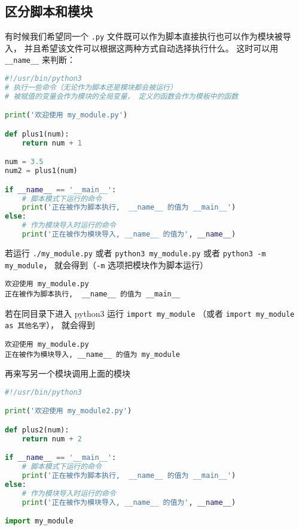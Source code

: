 
\begin{issues}
\issueDraft
\end{issues}

\subsection{区分脚本和模块}
有时候我们希望同一个 \verb|.py| 文件既可以作为脚本直接执行也可以作为模块被导入， 并且希望该文件可以根据这两种方式自动选择执行什么。 这时可以用 \verb|__name__| 来判断：
\begin{lstlisting}[language=python, caption=my\_module.py]
#!/usr/bin/python3
# 执行一些命令（无论作为脚本还是模块都会被运行）
# 被赋值的变量会作为模块的全局变量， 定义的函数会作为模板中的函数

print('欢迎使用 my_module.py')

def plus1(num):
    return num + 1

num = 3.5
num2 = plus1(num)

if __name__ == '__main__':
    # 脚本模式下运行的命令
    print('正在被作为脚本执行,  __name__ 的值为 __main__')
else:
    # 作为模块导入时运行的命令
    print('正在被作为模块导入, __name__ 的值为', __name__)
\end{lstlisting}
若运行 \verb|./my_module.py| 或者 \verb|python3 my_module.py| 或者 \verb|python3 -m my_module|， 就会得到（\verb|-m| 选项把模块作为脚本运行）
\begin{lstlisting}[language=none]
欢迎使用 my_module.py
正在被作为脚本执行,  __name__ 的值为 __main__
\end{lstlisting}
若在同目录下进入 python3 运行 \verb|import my_module| （或者 \verb|import my_module as 其他名字|）， 就会得到
\begin{lstlisting}[language=none]
欢迎使用 my_module.py
正在被作为模块导入, __name__ 的值为 my_module
\end{lstlisting}

再来写另一个模块调用上面的模块
\begin{lstlisting}[language=python,caption=my\_module2.py]
#!/usr/bin/python3

print('欢迎使用 my_module2.py')

def plus2(num):
    return num + 2

if __name__ == '__main__':
    # 脚本模式下运行的命令
    print('正在被作为脚本执行,  __name__ 的值为 __main__')
else:
    # 作为模块导入时运行的命令
    print('正在被作为模块导入, __name__ 的值为', __name__)

import my_module
\end{lstlisting}

